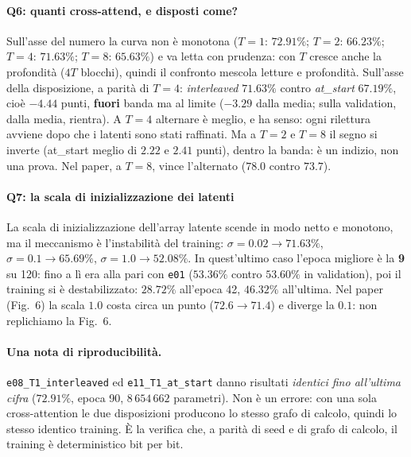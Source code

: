 \documentclass[
  11pt,
]{article}
\begin{document}
\paragraph{Q6: quanti cross-attend, e disposti come?}
Sull'asse del numero la curva non è monotona ($T{=}1$: $72.91\%$; $T{=}2$: $66.23\%$; $T{=}4$: $71.63\%$; $T{=}8$: $65.63\%$) e va letta con prudenza: con $T$ cresce anche la profondità ($4T$ blocchi), quindi il confronto mescola letture e profondità. Sull'asse della disposizione, a parità di $T{=}4$: \emph{interleaved} $71.63\%$ contro \emph{at\_start} $67.19\%$, cioè $-4.44$ punti, \textbf{fuori} banda ma al limite ($-3.29$ dalla media; sulla validation, dalla media, rientra). A $T{=}4$ alternare è meglio, e ha senso: ogni rilettura avviene dopo che i latenti sono stati raffinati. Ma a $T{=}2$ e $T{=}8$ il segno si inverte (at\_start meglio di $2.22$ e $2.41$ punti), dentro la banda: è un indizio, non una prova. Nel paper, a $T{=}8$, vince l'alternato ($78.0$ contro $73.7$).

\paragraph{Q7: la scala di inizializzazione dei latenti}
La scala di inizializzazione dell'array latente scende in modo netto e monotono, ma il meccanismo è l'instabilità del training: $\sigma = 0.02 \to 71.63\%$, $\sigma = 0.1 \to 65.69\%$, $\sigma = 1.0 \to \mathbf{52.08\%}$. In quest'ultimo caso l'epoca migliore è la \textbf{9} su 120: fino a lì era alla pari con \texttt{e01} ($53.36\%$ contro $53.60\%$ in validation), poi il training si è destabilizzato: $28.72\%$ all'epoca 42, $46.32\%$ all'ultima. Nel paper (Fig.~6) la scala $1.0$ costa circa un punto ($72.6 \to 71.4$) e diverge la $0.1$: non replichiamo la Fig.~6.

\paragraph{Una nota di riproducibilità.} \texttt{e08\_T1\_interleaved} ed \texttt{e11\_T1\_at\_start} danno risultati \emph{identici fino all'ultima cifra} ($72.91\%$, epoca 90, $8\,654\,662$ parametri). Non è un errore: con una sola cross-attention le due disposizioni producono lo stesso grafo di calcolo, quindi lo stesso identico training. È la verifica che, a parità di seed e di grafo di calcolo, il training è deterministico bit per bit.
\end{document}
